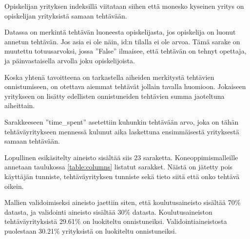 \documentclass[finnish,twoside,openright]{HYgraduMLDS}
\begin{document}
Opiskelijan yrityksen indeksillä viitataan siihen että monesko kyseinen yritys on opiskelijan yrityksistä samaan tehtävään.

Datassa on merkintä tehtävän luoneesta opiskelijasta, jos opiskelija on luonut annetun tehtävän. Jos asia ei ole näin, id:n tilalla ei ole arvoa. Tämä sarake on muutettu totuusarvoksi, jossa ''False'' ilmaisee, että tehtävän on tehnyt opettaja, ja päinvastaisella arvolla joku opiskelijoista.

Koska yhtenä tavoitteena on tarkastella aiheiden merkitystä tehtävien onnistumiseen, on otettava aiemmat tehtävät jollain tavalla huomioon. Jokaiseen yritykseen on lisätty edellisten onnistuneiden tehtävien summa jaoteltuna aiheittain.

Sarakkeeseen ''time\_spent'' asetettiin kuhunkin tehtävään arvo, joka on tähän tehtäväyritykseen mennessä kulunut aika laskettuna ensimmäisestä yrityksestä samaan tehtävään.

Lopullinen esikäsitelty aineisto sisältää siis 23 saraketta. Koneoppimismalleille annetaan taulukossa \ref{table:columns} listatut sarakket. Näistä on jätetty pois käyttäjän tunniste, tehtäväyrityksen tunniste sekä tieto siitä että onko tehtävä oikein. 

Mallien validoimiseksi aineisto jaettiin siten, että koulutusaineisto sisältää 70\% datasta, ja validointi aineisto sisältää 30\% datasta. Koulutusaineiston tehtäväyrityksistä 29.61\% on luokiteltu onnistuneiksi. Validointiaineistosta puolestaan 30.21\% yrityksistä on luokiteltu onnistuneiksi.
\end{document}
